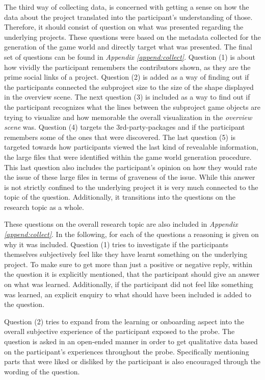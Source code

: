 The third way of collecting data, is concerned with getting a sense on how the data about the project translated into the participant's understanding of those. Therefore, it should consist of question on what was presented regarding the underlying projects. These questions were based on the metadata collected for the generation of the game world and directly target what was presented. The final set of questions can be found in \textit{Appendix \ref{append:collect}}. Question (1) is about how vividly the participant remembers the contributors shown, as they are the prime social links of a project. Question (2) is added as a way of finding out if the participants connected the subproject size to the size of the shape displayed in the overview scene. The next question (3) is included as a way to find out if the participant recognizes what the lines between the subproject game objects are trying to visualize and how memorable the overall visualization in the \textit{overview scene} was. Question (4) targets the 3rd-party-packages and if the participant remembers some of the ones that were discovered. The last question (5) is targeted towards how participants viewed the last kind of revealable information, the large files that were identified within the game world generation procedure. This last question also includes the participant's opinion on how they would rate the issue of these large files in terms of graveness of the issue. While this answer is not strictly confined to the underlying project it is very much connected to the topic of the question. Additionally, it transitions into the questions on the research topic as a whole.

These questions on the overall research topic are also included in \textit{Appendix \ref{append:collect}}. In the following, for each of the questions a reasoning is given on why it was included. Question (1) tries to investigate if the participants themselves subjectively feel like they have learnt something on the underlying project. To make sure to get more than just a positive or negative reply, within the question it is explicitly mentioned, that the participant should give an answer on what was learned. Additionally, if the participant did not feel like something was learned, an explicit enquiry to what should have been included is added to the question.

Question (2) tries to expand from the learning or onboarding aspect into the overall subjective experience of the participant exposed to the probe. The question is asked in an open-ended manner in order to get qualitative data based on the participant's experiences throughout the probe. Specifically mentioning parts that were liked or disliked by the participant is also encouraged through the wording of the question.

